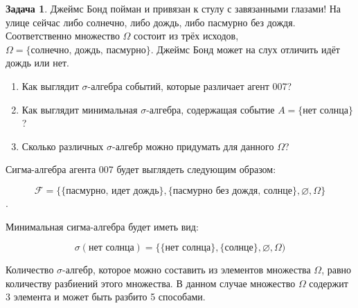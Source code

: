 \documentclass[pdftex, 12pt, a4paper]{article}
\def\F{\ensuremath{\mathcal{F}}} %
\def\s{\ensuremath{\sigma}}
\theoremstyle{definition} %
\newtheorem{problem}{Задача}
\numberwithin{problem}{section}
\numberwithin{blits}{section}
\begin{document}
\begin{problem}
Джеймс Бонд пойман и привязан к стулу с завязанными глазами! На улице сейчас либо солнечно, либо дождь, либо пасмурно без дождя. Соответственно множество $\Omega$ состоит из трёх исходов, $\Omega  = \{\text{солнечно, дождь, пасмурно}\}$. Джеймс Бонд может на слух отличить идёт дождь или нет. 

\begin{enumerate}
\item Как выглядит $\sigma$-алгебра событий, которые различает агент 007?

\item Как выглядит минимальная $\sigma$-алгебра, содержащая событие $A = \{\text{нет солнца}\}$?

\item Сколько различных $\sigma$-алгебр можно придумать для данного $\Omega$?
\end{enumerate}
\begin{sol}
Сигма-алгебра агента 007 будет выглядеть следующим образом:

\[ \F = \{ \{\text{пасмурно, идет дождь} \},\{\text{пасмурно без дождя, солнце} \},\varnothing,\Omega \} \].

Минимальная сигма-алгебра будет иметь вид:

\[\sigma( \text{нет солнца}) = \{ \{\text{нет солнца}\}, \{\text{солнце} \},\varnothing ,\Omega)\] 

Количество \s-алгебр, которое можно составить из элементов множества $\Omega$, равно количеству разбиений этого множества. В данном случае множество $\Omega$ содержит 3 элемента и может быть разбито 5 способами. 
\end{sol}
\end{problem}
\end{document}
